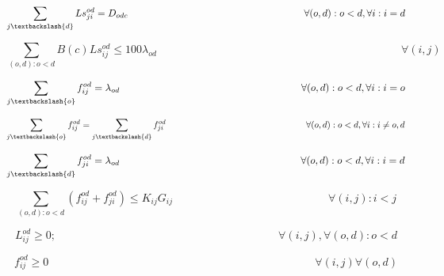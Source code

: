 \begin{equation}
\sum_{j\textbackslash \{d\}} Ls_{ji}^{od} = D_{odc} \qquad \qquad \qquad \qquad \qquad \qquad \qquad \qquad \qquad
\forall(o,d) : o < d, \forall i: i = d
\label{ILPTransluc3}
\end{equation}

\begin{equation}
\sum_{(o,d):o<d} B(c) Ls_{ij}^{od} \leq  100 \lambda_{od} \qquad \qquad \qquad \qquad \qquad \qquad \qquad \qquad \qquad \qquad \qquad 
\forall (i,j)
\label{ILPTransluc4}
\end{equation}

\begin{equation}
\sum_{j\textbackslash \{o\}} f_{ij}^{od} = \lambda_{od}  \qquad \qquad \qquad \qquad \qquad \qquad \qquad \qquad \qquad
\forall(o,d) : o < d, \forall i: i = o
\label{ILPTransluc6}
\end{equation}

\begin{equation}
\sum_{j\textbackslash \{o\}} f_{ij}^{od} = \sum_{j\textbackslash \{d\}} f_{ji}^{od} \qquad \qquad \qquad \qquad \qquad \qquad \qquad \qquad
\forall(o,d) : o < d, \forall i: i \neq o,d
\label{ILPTransluc7}
\end{equation}

\begin{equation}
\sum_{j\textbackslash \{d\}} f_{ji}^{od} = \lambda_{od}  \qquad \qquad \qquad \qquad \qquad \qquad \qquad \qquad \qquad
\forall(o,d) : o < d, \forall i: i = d
\label{ILPTransluc8}
\end{equation}

\begin{equation}
\sum_{(o,d):o<d} \left( f_{ij}^{od} + f_{ji}^{od}\right) \leq K_{ij} G_{ij}
\qquad \qquad \qquad \qquad \qquad \qquad \qquad
\forall (i,j) : i < j
\label{ILPTransluc9}
\end{equation}

\begin{equation}
L_{ij}^{od} \geq 0;
\qquad \qquad \qquad \qquad \qquad \qquad \qquad \qquad \qquad \qquad
\forall (i,j) , \forall (o,d) : o < d
\label{ILPTransluc5}
\end{equation}

\begin{equation}
f_{ij}^{od} \geq 0
\qquad \qquad \qquad \qquad \qquad \qquad \qquad \qquad \qquad \qquad \qquad \qquad
\forall (i,j) \forall (o,d)
\label{ILPTransluc10}
\end{equation}	

